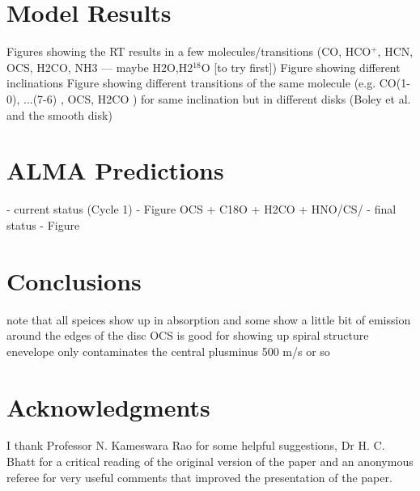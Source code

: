 \documentclass[useAMS,usenatbib]{mn2e}
\begin{document}
\section{Model Results}

Figures showing the RT results in a few molecules/transitions (CO, HCO$^+$, HCN, OCS, H2CO, NH3 --- maybe H2O,H2$^{18}$O [to try first])  
Figure showing different inclinations  
Figure showing different transitions of the same molecule (e.g. CO(1-0), ...(7-6) , OCS,  H2CO ) for same inclination but in different disks (Boley et al. and the smooth disk)

\section{ALMA Predictions}

- current status (Cycle 1) - Figure
OCS + C18O + H2CO + HNO/CS/
- final status - Figure 


\section{Conclusions}

note that all speices show up in absorption and some show a little bit of emission around the edges of the disc
OCS is good for showing up spiral structure
enevelope only contaminates the central plusminus 500 m/s or so


\section*{Acknowledgments}

I thank Professor N. Kameswara Rao for some helpful suggestions,
Dr H. C. Bhatt for a critical reading of the original version of the
paper and an anonymous referee for very useful comments that improved
the presentation of the paper.
\end{document}
